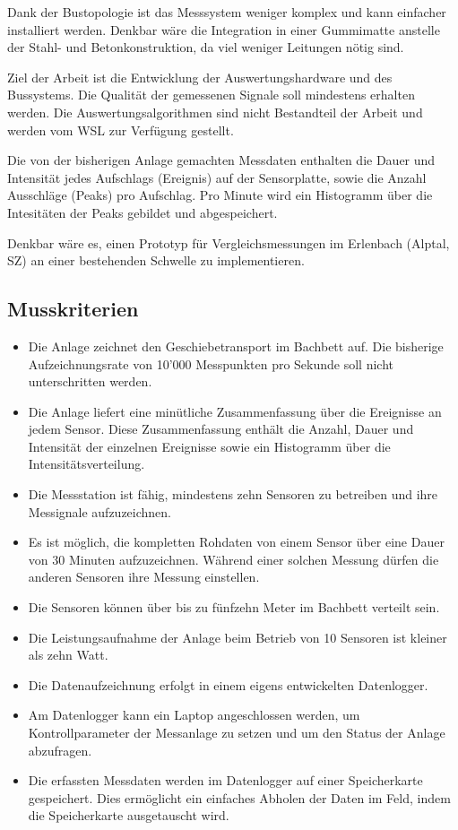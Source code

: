 Dank der Bustopologie ist das Messsystem weniger komplex und kann einfacher installiert werden. Denkbar wäre die Integration in einer Gummimatte anstelle der Stahl- und Betonkonstruktion, da viel weniger Leitungen nötig sind.

Ziel der Arbeit ist die Entwicklung der Auswertungshardware und des Bussystems. Die Qualität der gemessenen Signale soll mindestens erhalten werden. Die Auswertungsalgorithmen sind nicht Bestandteil der Arbeit und werden vom WSL zur Verfügung gestellt.

Die von der bisherigen Anlage gemachten Messdaten enthalten die Dauer und Intensität jedes Aufschlags (Ereignis) auf der Sensorplatte, sowie die Anzahl Ausschläge (Peaks) pro Aufschlag. Pro Minute wird ein Histogramm über die Intesitäten der Peaks gebildet und abgespeichert.

Denkbar wäre es, einen Prototyp für Vergleichsmessungen im Erlenbach (Alptal, SZ) an einer bestehenden Schwelle zu implementieren.

\subsection{Musskriterien}
\begin{itemize}
\item Die Anlage zeichnet den Geschiebetransport im Bachbett auf. Die bisherige Aufzeichnungsrate von 10'000 Messpunkten pro Sekunde soll nicht unterschritten werden.
\item Die Anlage liefert eine minütliche Zusammenfassung über die Ereignisse an jedem Sensor. Diese Zusammenfassung enthält die Anzahl, Dauer und Intensität der einzelnen Ereignisse sowie ein Histogramm über die Intensitätsverteilung.
\item Die Messstation ist fähig, mindestens zehn Sensoren zu betreiben und ihre Messignale aufzuzeichnen.
\item Es ist möglich, die kompletten Rohdaten von einem Sensor über eine Dauer von 30 Minuten aufzuzeichnen. Während einer solchen Messung dürfen die anderen Sensoren ihre Messung einstellen.
\item Die Sensoren können über bis zu fünfzehn Meter im Bachbett verteilt sein.
\item Die Leistungsaufnahme der Anlage beim Betrieb von 10 Sensoren ist kleiner als zehn Watt.
\item Die Datenaufzeichnung erfolgt in einem eigens entwickelten Datenlogger.
\item Am Datenlogger kann ein Laptop angeschlossen werden, um Kontrollparameter der Messanlage zu setzen und um den Status der Anlage abzufragen.
\item Die erfassten Messdaten werden im Datenlogger auf einer Speicherkarte gespeichert. Dies ermöglicht ein einfaches Abholen der Daten im Feld, indem die Speicherkarte ausgetauscht wird.
\end{itemize}
